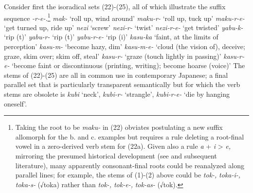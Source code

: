 \documentclass[output=paper,
modfonts
]{LSP/langsci}
\begin{document}
Consider first the isoradical sets (22)-(25), all of which illustrate
the suffix sequence \textit{-r-e-.}\footnote{Taking the root to be
  \textit{maku-} in (22) obviates postulating a new suffix allomorph for
  the b. and c. examples but requires a rule deleting a root-final vowel
  in a zero-derived verb stem for (22a). Given also a rule \textit{a} +
  \textit{i} \textgreater{} \textit{e,} mirroring the presumed historical
  development (see \citealt{ono1953a}  and subsequent literature), many apparently
  consonant-final roots could be reanalyzed along parallel lines; for
  example, the stems of (1)-(2) above could be \textit{tok-,}
  \textit{toka-i-, toka-s-} (√toka) rather than \textit{tok-, tok-e-,}
  \textit{tok-as-} (√tok).}
\ea
	 \ea \textit{mak-} `roll up, wind around'
	 \ex \textit{maku-r-} `roll up, tuck up'
	 \ex \textit{maku-r-e-} `get turned up, ride up'
	\z
\ex 
	 \ea \textit{nezi} `screw'
	 \ex \textit{nezi-r-} `twist'
	 \ex \textit{nezi-r-e-} `get twisted'
	\z
\ex  
	 \ea \textit{yabu-k-} `rip (t)'
	 \ex \textit{yabu-r-} `rip (t)'
	 \ex \textit{yabu-r-e-} `rip (i)'
	\z
\ex 
	 \ea \textit{kasu-ka} `faint, at the limits of perception'
	 \ex \textit{kasu-m-} `become hazy, dim'
	 \ex \textit{kasu-m-e-} `cloud (the vision of), deceive; graze, skim over; skim off, steal'
	 \ex \textit{kasu-r-} `graze (touch lightly in passing)'
	 \ex \textit{kasu-r-e-} `become faint or discontinuous (printing, writing); become hoarse (voice)'
	\z
\z
The stems of (22)-(25) are all in common use in contemporary Japanese; a
final parallel set that is particularly transparent semantically but for
which the verb stems are obsolete is \textit{kubi} `neck', \textit{kubi-r-}
`strangle', \textit{kubi-r-e-} `die by hanging oneself'.
\end{document}
